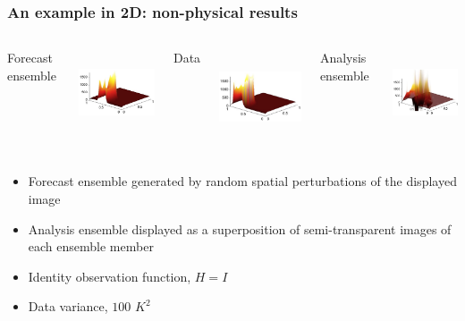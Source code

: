 \documentclass{beamer}
\begin{document}
\begin{frame}%
\frametitle{An example in 2D: non-physical results}%
\vspace{-.3in}
\begin{columns}%
%
\begin{center}Forecast ensemble\end{center}
\includegraphics[height=1in]{eps/fire2d_prior}
%
\begin{center}Data\end{center}
\includegraphics[height=1.1in]{eps/fire2d_data}
%
\begin{center}Analysis ensemble\end{center}
\includegraphics[height=1in]{eps/fire2d_post}
\end{columns}
\vspace{.1in}
\begin{itemize}
\item
Forecast ensemble generated by random spatial perturbations of the displayed image
\item
Analysis ensemble displayed as a superposition of semi-transparent images of each ensemble member
\item
Identity observation function, $H=I$
\item
Data variance, $100$ $K^2$
\end{itemize}
\end{frame}

\end{document}

